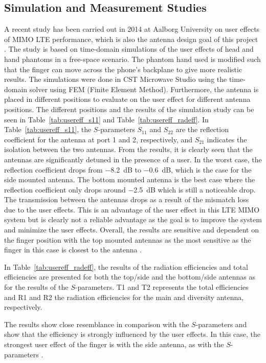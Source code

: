 \subsection{Simulation and Measurement Studies}
A recent study has been carried out in 2014 at Aalborg University on user effects of MIMO LTE performance, which is also the antenna design goal of this project \cite{Samantha2014UserEff}. The study is based on time-domain simulations of the user effects of head and hand phantoms in a free-space scenario. The phantom hand used is modified such that the finger can move across the phone's backplane to give more realistic results. The simulations were done in CST Microwave Studio using the time-domain solver using FEM (Finite Element Method). Furthermore, the antenna is placed in different positions to evaluate on the user effect for different antenna positions. The different positions and the results of the simulation study can be seen in Table~\ref{tab:usereff_s11} and Table~\ref{tab:usereff_radeff}. In Table~\ref{tab:usereff_s11}, the $S$-parameters $S_{11}$ and $S_{22}$ are the reflection coefficient for the antenna at port 1 and 2, respectively, and $S_{21}$ indicates the isolation between the two antennas. From the results, it is clearly seen that the antennas are significantly detuned in the presence of a user. In the worst case, the reflection coefficient drops from \SI{-8.2}{dB} to \SI{-0.6}{dB}, which is the case for the side mounted antenna. The bottom mounted antenna is the best case where the reflection coefficient only drops around \SI{-2.5}{dB} which is still a noticeable drop. The transmission between the antennas drops as a result of the mismatch loss due to the user effects. This is an advantage of the user effect in this LTE MIMO system but is clearly not a reliable advantage as the goal is to improve the system and minimize the user effects. Overall, the results are sensitive and dependent on the finger position with the top mounted antennas as the most sensitive as the finger in this case is closest to the antenna \cite{Samantha2014UserEff}.

In Table~\ref{tab:usereff_radeff}, the results of the radiation efficiencies and total efficiencies are presented for both the top/side and the bottom/side antennas as for the results of the $S$-parameters. T1 and T2 represents the total efficiencies and R1 and R2 the radiation efficiencies for the main and diversity antenna, respectively. 

The results show close resemblance in comparison with the $S$-parameters and show that the efficiency is strongly influenced by the user effects. In this case, the strongest user effect of the finger is with the side antenna, as with the $S$-parameters \cite{Samantha2014UserEff}.

